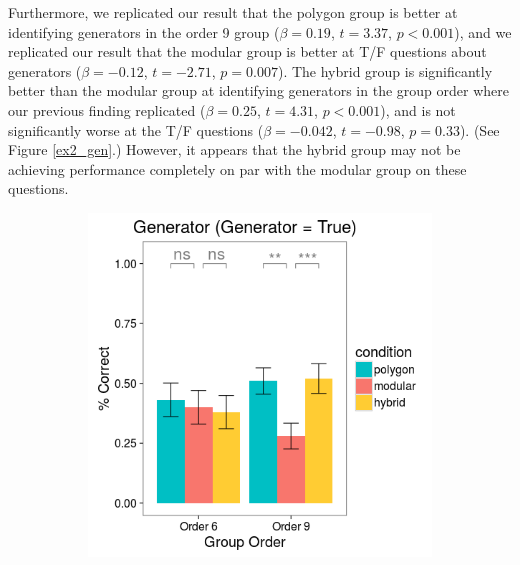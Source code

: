 \documentclass[11pt]{article}
\begin{document}
Furthermore, we replicated our result that the polygon group is better at identifying generators in the order 9 group ($\beta = 0.19$, $t = 3.37$, $p < 0.001$), and we replicated our result that the modular group is better at T/F questions about generators ($\beta = -0.12$, $t = -2.71$, $p = 0.007$). The hybrid group is significantly better than the modular group at identifying generators in the group order where our previous finding replicated ($\beta = 0.25$, $t = 4.31$, $p < 0.001$), and is not significantly worse at the T/F questions ($\beta = -0.042$, $t = -0.98$, $p = 0.33$). (See Figure \ref{ex2_gen}.) However, it appears that the hybrid group may not be achieving performance completely on par with the modular group on these questions.
\begin{figure}[H]
\centering
\begin{subfigure}[c]{0.4\textwidth}
\centering
\includegraphics[width=\textwidth]{figures/2/gen_T_r.png}
\end{subfigure}
~
\begin{subfigure}[c]{0.4\textwidth}
\centering

\end{subfigure}
\end{figure}
\end{document}
